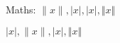 \documentclass{article}
\begin{document}
Maths:
\(\|x\|, |x|, \vert x \vert, \Vert x \Vert\)

\(|x|, \|x\|, \vert x \vert, \Vert x \Vert\)
\end{document}
